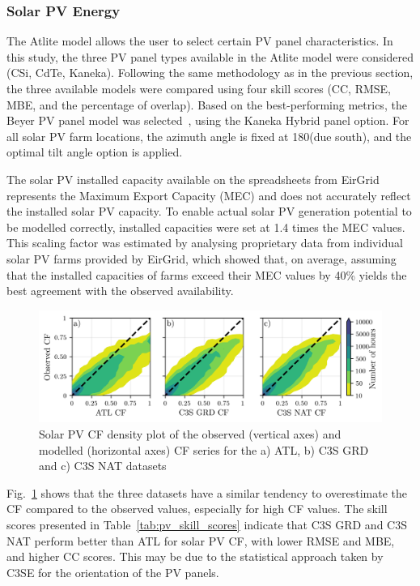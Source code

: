 \documentclass[preprint, 12pt]{elsarticle}
\begin{document}
\subsubsection{Solar PV Energy}
\label{sec:pv_verification}

The Atlite model allows the user to select certain PV panel characteristics. In this study, the three PV panel types available in the Atlite model were considered (CSi, CdTe, Kaneka). Following the same methodology as in the previous section, the three available models were compared using four skill scores (CC, RMSE, MBE, and the percentage of overlap). Based on the best-performing metrics, the Beyer PV panel model was selected~\citep{beyer2004pv}, using the Kaneka Hybrid panel option. For all solar PV farm locations, the azimuth angle is fixed at 180\textdegree (due south), and the optimal tilt angle option is applied. 

The solar PV installed capacity available on the spreadsheets from EirGrid represents the Maximum Export Capacity (MEC) and does not accurately reflect the installed solar PV capacity. To enable actual solar PV generation potential to be modelled correctly, installed capacities were set at 1.4 times the MEC values. This scaling factor was estimated by analysing proprietary data from individual solar PV farms provided by EirGrid, which showed that, on average, assuming that the installed capacities of farms exceed their MEC values by 40\% yields the best agreement with the observed availability.

\begin{figure}[h!]
	\centering
	\includegraphics[width=\textwidth]{verification_pv_contour.png}
	\caption{Solar PV CF density plot of the observed (vertical axes) and modelled (horizontal axes) CF series for the a) ATL, b) C3S GRD and c) C3S NAT datasets}	
	\label{fig:solar_verification_contour}
\end{figure}

Fig.~\ref{fig:solar_verification_contour} shows that the three datasets have a similar tendency to overestimate the CF compared to the observed values, especially for high CF values. The skill scores presented in Table~\ref{tab:pv_skill_scores} indicate that C3S GRD and C3S NAT perform better than ATL for solar PV CF, with lower RMSE and MBE, and higher CC scores. This may be due to the statistical approach taken by C3SE for the orientation of the PV panels.
\end{document}
